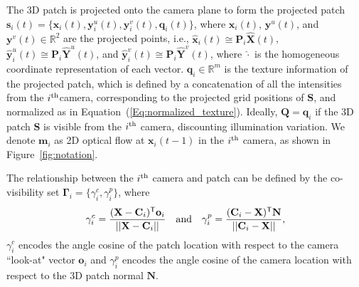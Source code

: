 \documentclass[10pt,twocolumn,letterpaper]{article}
\begin{document}
The 3D patch is projected onto the camera plane to form the projected patch $\mathbf{s}_i(t) = \{\mathbf{x}_i(t), \mathbf{y}_i^u(t), \mathbf{y}_i^v(t), \mathbf{q}_i(t) \}$, where $\mathbf{x}_i(t)$, $\mathbf{y}^u(t)$, and $\mathbf{y}^v(t) \in \mathds{R}^2$ are the projected points, i.e., $\widehat{\mathbf{x}}_i(t) \cong \mathbf{P}_i \widehat{\mathbf{X}}(t)$, $\widehat{\mathbf{y}}_i^u(t) \cong \mathbf{P}_i \widehat{\mathbf{Y}}^u(t)$, and $\widehat{\mathbf{y}}_i^v(t) \cong \mathbf{P}_i \widehat{\mathbf{Y}}^v(t)$, where $\widehat{\cdot}$ is the homogeneous coordinate representation of each vector. $\mathbf{q}_i  \in \mathds{R}^m$ is the texture information of the projected patch, which is defined by a concatenation of all the intensities from the $i^{\rm th}$camera, corresponding to the projected grid positions of $\mathbf{S}$, and normalized as in Equation~(\ref{Eq:normalized_texture}). Ideally, $\mathbf{Q}=\mathbf{q}_i$ if the 3D patch $\mathbf{S}$ is visible from the $i^{\rm th}$ camera, discounting illumination variation. We denote $\mathbf{m}_i$ as 2D optical flow at $\mathbf{x}_i(t-1)$ in the $i^{\rm th}$ camera, as shown in Figure~\ref{fig:notation}. 

The relationship between the $i^{\rm th}$ camera and patch can be defined by the co-visibility set $\mathbf{\Gamma}_i = \{\gamma^c_i, \gamma^p_i\}$, where
\begin{eqnarray}
\gamma^c_i = \frac{ (\mathbf{X}-\mathbf{C}_i)^\mathsf{T}\mathbf{o}_i} { || \mathbf{X}-\mathbf{C}_i || }~~~{\rm and}~~~\gamma^p_i = \frac{ (\mathbf{C}_i - \mathbf{X})^\mathsf{T}\mathbf{N}} { || \mathbf{C}_i - \mathbf{X} || }, \nonumber
\end{eqnarray}
$\gamma^c_i$ encodes the angle cosine of the patch location with respect to the camera ``look-at" vector $\mathbf{o}_i$ and $\gamma^p_i$ encodes the angle cosine of the camera location with respect to the 3D patch normal $\mathbf{N}$.



\end{document}
